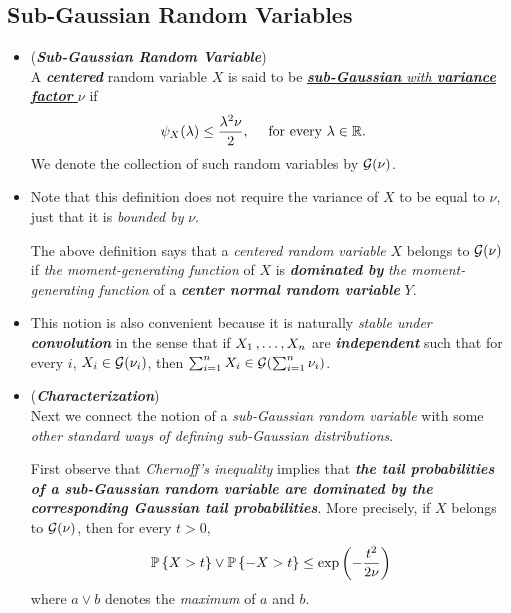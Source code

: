 \documentclass[11pt]{article}
\begin{document}
\subsection{Sub-Gaussian Random Variables}
\begin{itemize}
\item \begin{definition}(\textbf{\emph{Sub-Gaussian Random Variable}})\\
A \emph{\textbf{centered}} random variable $X$ is said to be \underline{\emph{\textbf{sub-Gaussian} with \textbf{variance factor} $\nu$}} if
\begin{align}
\psi_X(\lambda) &\le  \frac{\lambda^2 \nu}{2}, \quad \text{ for every }\lambda \in {\mathbb R}. \label{eqn: sub_gaussian_def_1}
\end{align} We denote the collection of such random variables by ${\mathcal G}(\nu)$.
\end{definition}

\item \begin{remark}
Note that this definition does not require the variance of $X$ to be equal to $\nu$, just that it is \emph{bounded by} $\nu$. 

The above definition says that a \emph{centered random variable} $X$ belongs to ${\mathcal G}(\nu)$ if \emph{the moment-generating function} of $X$ is \emph{\textbf{dominated by}} \emph{the moment-generating function} of a \emph{\textbf{center normal random variable}} $Y$. 
\end{remark}

\item \begin{remark}
This notion is also convenient because it is naturally \emph{stable under \textbf{convolution}} in the sense that if $X_1 \,{,}\ldots{,}\, X_n$ are \emph{\textbf{independent}} such that for every $i$, $X_i \in {\mathcal G}(\nu_i)$, then $\sum_{i=1}^{n}X_i \in {\mathcal G}(\sum_{i=1}^{n}\nu_i)$.
\end{remark}

\item \begin{remark} (\emph{\textbf{Characterization}})\\
Next we connect the notion of a \emph{sub-Gaussian random variable} with some \emph{other standard ways of defining sub-Gaussian distributions}. 

First observe that \emph{Chernoff's inequality} implies that \emph{\textbf{the tail probabilities of a sub-Gaussian random variable
are dominated by the corresponding Gaussian tail probabilities}}. More precisely, if $X$ belongs to ${\mathcal G}(\nu)$, then for every $t > 0$,
\begin{align*}
{\mathbb P}\left\{X > t\right\} \lor  {\mathbb P}\left\{-X > t\right\} \le \exp\left(-\frac{t^2}{2\nu}\right)
\end{align*} where $a \lor b$ denotes the \emph{maximum} of $a$ and $b$. 
\end{remark}


\end{itemize}
\end{document}
